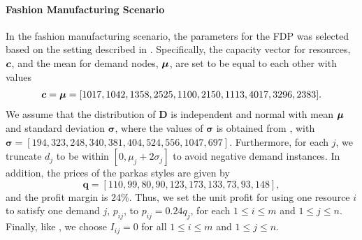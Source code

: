 \documentclass{article} %
\begin{document}
\paragraph{Fashion Manufacturing Scenario}
In the fashion manufacturing scenario, the parameters for the FDP was selected based on the setting described in \citet{chou2014performance}. Specifically, the capacity vector for resources, $\boldsymbol{c}$, and the mean for demand nodes, $\boldsymbol{\mu}$, are set to be equal to each other with values 
\begin{align*}
\boldsymbol{c} = \boldsymbol{\mu} = [1017, 1042,1358,2525,1100,2150,1113,4017,3296,2383].
\end{align*}
We assume that the distribution of $\mathbf{D}$ is independent and normal with mean $\boldsymbol{\mu}$ and standard deviation $\boldsymbol{\sigma}$, where the values of $\boldsymbol{\sigma}$ is obtained from \citet{chou2014performance}, with $\boldsymbol{\sigma}= [194,323,248,340,381, 404, 524, 556, 1047, 697]$. Furthermore, for each $j$, we truncate $d_j$ to be within $[0, \mu_j + 2\sigma_j]$ to avoid negative demand instances. In addition, the prices of the parkas styles are given by
$$\boldsymbol{q} = [110, 99, 80, 90, 123, 173, 133, 73, 93, 148],$$
and the profit margin is 24\%. Thus, we set the unit profit for using one resource $i$ to satisfy one demand $j$, $p_{ij}$, to $p_{ij} = 0.24q_j$, for each $1\leq i\leq m$ and $1 \leq j\leq n$. Finally, like \citet{chou2014performance}, we choose  $I_{ij}=0$ for all $1\leq i\leq m$ and $1 \leq j\leq n$. 
\end{document}
